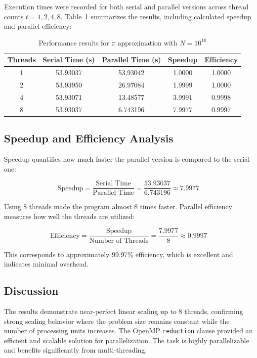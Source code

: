 \documentclass[unicode,11pt,a4paper,oneside,numbers=endperiod,openany]{scrartcl}
\begin{document}
Execution times were recorded for both serial and parallel versions across thread counts $t = 1, 2, 4, 8$. Table~\ref{tab:pi_scaling} summarizes the results, including calculated speedup and parallel efficiency:

\begin{table}[h!]
\centering
\caption{Performance results for $\pi$ approximation with $N = 10^{10}$}
\label{tab:pi_scaling}
\begin{tabular}{|c|c|c|c|c|}
\hline
\textbf{Threads} & \textbf{Serial Time (s)} & \textbf{Parallel Time (s)} & \textbf{Speedup} & \textbf{Efficiency} \\
\hline
1 & 53.93037 & 53.93042 & 1.0000 & 1.0000 \\
2 & 53.93950 & 26.97084 & 1.9999 & 1.0000 \\
4 & 53.93071 & 13.48577 & 3.9991 & 0.9998 \\
8 & 53.93037 & 6.743196 & 7.9977 & 0.9997 \\
\hline
\end{tabular}
\end{table}

\subsection*{Speedup and Efficiency Analysis}

Speedup quantifies how much faster the parallel version is compared to the serial one:

\[
\text{Speedup} = \frac{\text{Serial Time}}{\text{Parallel Time}} = \frac{53.93037}{6.743196} \approx 7.9977
\]

Using 8 threads made the program almost 8 times faster. Parallel efficiency measures how well the threads are utilized:

\[
\text{Efficiency} = \frac{\text{Speedup}}{\text{Number of Threads}} = \frac{7.9977}{8} \approx 0.9997
\]

This corresponds to approximately 99.97\% efficiency, which is excellent and indicates minimal overhead.

\subsection*{Discussion}

The results demonstrate near-perfect linear scaling up to 8 threads, confirming strong scaling behavior where the problem size remains constant while the number of processing units increases. The OpenMP \texttt{reduction} clause provided an efficient and scalable solution for parallelization. The task is highly parallelizable and benefits significantly from multi-threading.
\end{document}
